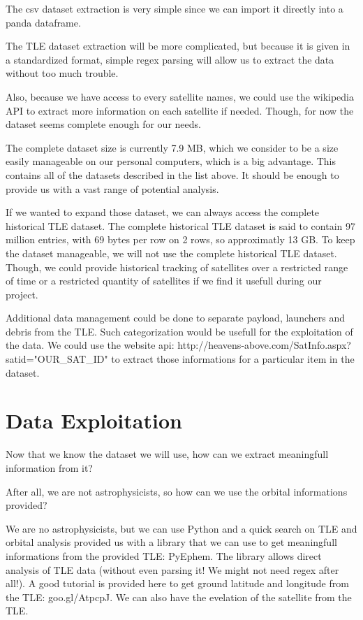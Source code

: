 \documentclass[11pt,letterpaper]{article}
\begin{document}
The csv dataset extraction is very simple since we can import it directly into a panda dataframe.

The TLE dataset extraction will be more complicated, but because it is given in a standardized format, simple regex parsing
will allow us to extract the data without too much trouble.

Also, because we have access to every satellite names, we could use the wikipedia API to extract more information on each satellite if needed.
Though, for now the dataset seems complete enough for our needs.

The complete dataset size is currently 7.9 MB, which we consider to be a size easily manageable on our personal computers, which is a big advantage. 
This contains all of the datasets described in the list above. 
It should be enough to provide us with a vast range of potential analysis. 

If we wanted to expand those dataset, we can always access the complete historical TLE dataset.
The complete historical TLE dataset is said to contain 97 million entries, with 69 bytes per row on 2 rows, so approximatly 13 GB\@.
To keep the dataset manageable, we will not use the complete historical TLE dataset.
Though, we could provide historical tracking of satellites over a restricted range of time or a restricted quantity of satellites if we find it usefull during our project.

Additional data management could be done to separate payload, launchers and debris from the TLE\@. 
Such categorization would be usefull for the exploitation of the data. 
We could use the website api: http://heavens-above.com/SatInfo.aspx?satid="OUR\_SAT\_ID" to extract those informations for a particular item in the dataset.


\section{Data Exploitation}

Now that we know the dataset we will use, how can we extract meaningfull information from it?

After all, we are not astrophysicists, so how can we use the orbital informations provided?

We are no astrophysicists, but we can use Python and a quick search on TLE and orbital analysis provided us with a library that we can use to get meaningfull informations from the provided TLE: PyEphem.
The library allows direct analysis of TLE data (without even parsing it! We might not need regex after all!).
A good tutorial is provided here to get ground latitude and longitude from the TLE: goo.gl/AtpcpJ.
We can also have the evelation of the satellite from the TLE.
\end{document}

